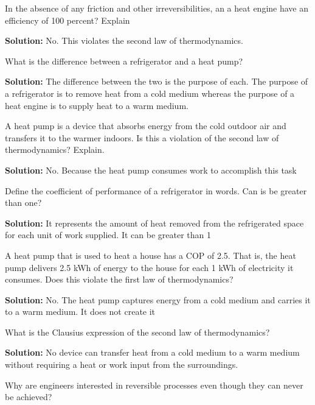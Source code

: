\begin{list}{\bf Question :~}{}
%
     \item\label{Q7} In the absence of any friction and other irreversibilities, an a heat engine have an efficiency of 100 percent? Explain
%

       {\bf Solution:} No. This violates the second law of thermodynamics.
%
     \item\label{Q8} What is the difference between a refrigerator and a heat pump?
%

       {\bf Solution:}  The difference between the two is the purpose of each. The purpose of a refrigerator is to remove heat from a cold medium whereas the purpose of a heat engine is to supply heat to a warm medium.

%
     \item\label{Q9} A heat pump is a device that absorbs energy from the cold outdoor air and transfers it to the warmer indoors. Is this a violation of the second law of thermodynamics? Explain.
%

       {\bf Solution:} No. Because the heat pump consumes work to accomplish this task
%
     \item\label{Q10} Define the coefficient of performance of a refrigerator in words. Can is be greater than one? 
%

       {\bf Solution:} It represents the amount of heat removed from the refrigerated space for each unit of work supplied. It can be greater than 1

%
     \item\label{Q11} A heat pump that is used to heat a house has a COP of 2.5. That is, the heat pump delivers 2.5 kWh of energy to the house for each 1 kWh of electricity it consumes. Does this violate the first law of thermodynamics?
%

       {\bf Solution:} No. The heat pump captures energy from a cold medium and carries it to a warm medium. It does not create it
%
     \item\label{Q12} What is the Clausius expression of the second law of thermodynamics?
%

       {\bf Solution:} No device can transfer heat from a cold medium to a warm medium without requiring a heat or work input from the surroundings.

%
     \item\label{Q13} Why are engineers interested in reversible processes even though they can never be achieved?
%


\end{list}
